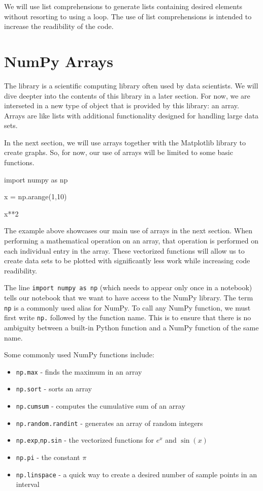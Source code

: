\documentclass{ximera}
\begin{document}
We will use list comprehensions to generate lists containing desired elements without resorting to using a loop. The use of list comprehensions is intended to increase the readibility of the code.

\section{NumPy Arrays}

The  library is a scientific computing library often used by data scientists. We will dive deepter into the contents of this library in a later section. For now, we are interseted in a new type of object that is provided by this library: an array. Arrays are like lists with additional functionality designed for handling large data sets. 

In the next section, we will use arrays together with the Matplotlib library to create graphs. So, for now, our use of arrays will be limited to some basic functions.

\begin{sageCell}
import numpy as np

x = np.arange(1,10)

x**2
\end{sageCell}

The example above showcases our main use of arrays in the next section. When performing a mathematical operation on an array, that operation is performed on each individual entry in the array. These vectorized functions will allow us to create data sets to be plotted with significantly less work while increasing code readibility.

The line \verb|import numpy as np| (which needs to appear only once in a notebook) tells our notebook that we want to have access to the NumPy library. The term \verb|np| is a commonly used alias for NumPy. To call any NumPy function, we must first write \verb|np.| followed by the function name. This is to ensure that there is no ambiguity between a built-in Python function and a NumPy function of the same name.

Some commonly used NumPy functions include:

\begin{itemize}
	\item \verb|np.max| - finds the maximum in an array
	\item \verb|np.sort| - sorts an array
	\item \verb|np.cumsum| - computes the cumulative sum of an array
	\item \verb|np.random.randint| - generates an array of random integers
	\item \verb|np.exp|,\verb|np.sin| - the vectorized functions for $e^x$ and $\sin(x)$
	\item \verb|np.pi| - the constant $\pi$
	\item \verb|np.linspace| - a quick way to create a desired number of sample points in an interval
\end{itemize}
\end{document}

